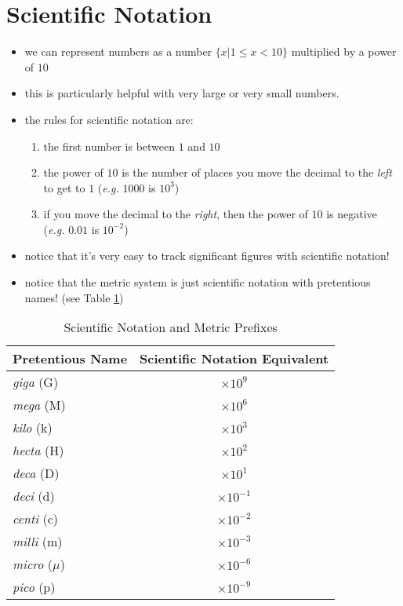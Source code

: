 \documentclass[11pt, oneside]{article}   	%
\begin{document}
\section{Scientific Notation}
\begin{itemize}
\item we can represent numbers as a number $\{ x | 1 \leq x < 10 \}$ multiplied by a power of $10$
\item this is particularly helpful with very large or very small numbers.
\item the rules for scientific notation are:
\begin{enumerate}
\item the first number is between $ 1 $ and $ 10 $
\item  the power of $ 10 $ is the number of places you move the decimal to the \emph{left} to get to $1$ (\emph{e.g.} $1000$ is $10^{3}$)
\item if you move the decimal to the \emph{right}, then the power of $ 10 $ is negative (\emph{e.g.} $0.01$ is $10^{-2}$)
\end{enumerate}
\item notice that it's very easy to track significant figures with scientific notation!
\item notice that the metric system is just scientific notation with pretentious names! (see Table \ref{table:pretentiousprefixes})
 \end{itemize}

\begin{table}
\centering
\begin{tabular}[c]{l|c}
\hline
Pretentious Name & Scientific Notation Equivalent \\
\hline
\emph{giga} (G)  & $ \times 10^{9} $   \\
\emph{mega} (M)  & $ \times 10^{6} $   \\
\emph{kilo} (k)      & $ \times 10^{3} $   \\
\emph{hecta} (H)      & $ \times 10^{2} $   \\
\emph{deca} (D)      & $ \times 10^{1} $   \\
\emph{deci} (d)      & $ \times 10^{-1} $   \\
\emph{centi} (c)     & $ \times 10^{-2} $   \\
\emph{milli}  (m)    & $ \times 10^{-3} $  \\
\emph{micro} ($\mu$)  & $ \times 10^{-6} $  \\
\emph{pico}  (p) & $ \times 10^{-9} $  \\
\end{tabular}
\caption{Scientific Notation and Metric Prefixes}
\label{table:pretentiousprefixes}
\end{table}
\end{document}
